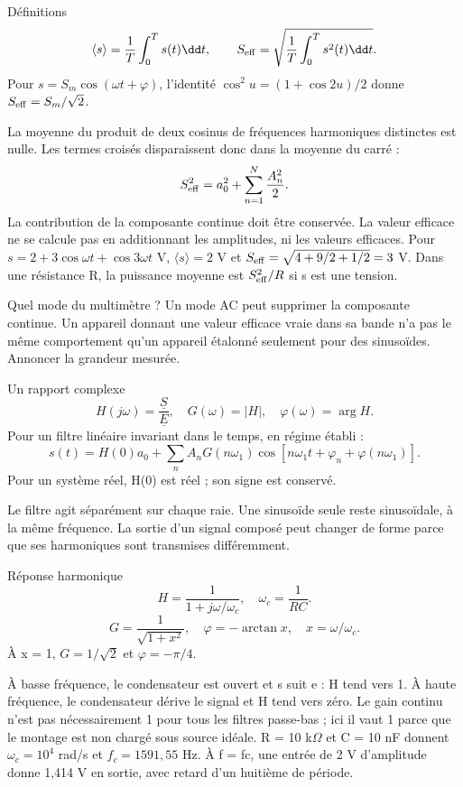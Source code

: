 \begin{loi}{Définitions}
\[\langle s\rangle=\frac1T\int_0^T s(t)\dd t,\qquad S_{\rm eff}=\sqrt{\frac1T\int_0^T s^2(t)\dd t}.\]Pour $s=S_m\cos(\omega t+\varphi)$, l’identité $\cos^2u=(1+\cos2u)/2$ donne $S_{\rm eff}=S_m/\sqrt2$.
\end{loi}
La moyenne du produit de deux cosinus de fréquences harmoniques distinctes est nulle. Les termes croisés disparaissent donc dans la moyenne du carré :\[S_{\rm eff}^2=a_0^2+\sum_{n=1}^N\frac{A_n^2}{2}.\]La contribution de la composante continue doit être conservée. La valeur efficace ne se calcule pas en additionnant les amplitudes, ni les valeurs efficaces.
Pour $s=2+3\cos\omega t+\cos3\omega t$ V, $\langle s\rangle=2$ V et $S_{\rm eff}=\sqrt{4+9/2+1/2}=3$ V. Dans une résistance R, la puissance moyenne est $S_{\rm eff}^2/R$ si s est une tension.
\begin{piege}{Quel mode du multimètre ?}
Un mode AC peut supprimer la composante continue. Un appareil donnant une valeur efficace vraie dans sa bande n’a pas le même comportement qu’un appareil étalonné seulement pour des sinusoïdes. Annoncer la grandeur mesurée.
\end{piege}


\begin{loi}{Un rapport complexe}
\[H(j\omega)=\frac{\underline S}{\underline E},\quad G(\omega)=|H|,\quad \varphi(\omega)=\arg H.\]Pour un filtre linéaire invariant dans le temps, en régime établi :\[s(t)=H(0)a_0+\sum_n A_nG(n\omega_1)\cos[n\omega_1t+\varphi_n+\varphi(n\omega_1)].\]Pour un système réel, H(0) est réel ; son signe est conservé.
\end{loi}
Le filtre agit séparément sur chaque raie. Une sinusoïde seule reste sinusoïdale, à la même fréquence. La sortie d’un signal composé peut changer de forme parce que ses harmoniques sont transmises différemment.


\begin{loi}{Réponse harmonique}
\[H=\frac1{1+j\omega/\omega_c},\quad \omega_c=\frac1{RC}.\]\[G=\frac1{\sqrt{1+x^2}},\quad\varphi=-\arctan x,\quad x=\omega/\omega_c.\]À x = 1, $G=1/\sqrt2$ et $\varphi=-\pi/4$.
\end{loi}
À basse fréquence, le condensateur est ouvert et s suit e : H tend vers 1. À haute fréquence, le condensateur dérive le signal et H tend vers zéro. Le gain continu n’est pas nécessairement 1 pour tous les filtres passe-bas ; ici il vaut 1 parce que le montage est non chargé sous source idéale.
R = 10 k$\Omega$ et C = 10 nF donnent $\omega_c=10^4$ rad/s et $f_c=1591{,}55$ Hz. À f = fc, une entrée de 2 V d’amplitude donne 1,414 V en sortie, avec retard d’un huitième de période.


